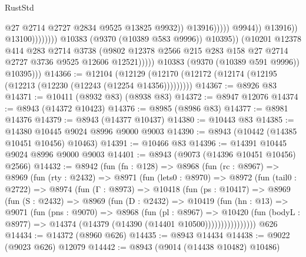 \begin{lexlean}{RustStd}
\begin{coremodule}
{\begin{coremodule}
{{{{{{{{{{{{{{{{{{{{{{{{{{{{{{{{{{{{{{{                                                          @27
                                                          @2714
                                                          @2727
                                                          @2834
                                                          @9525
                                                          @13825
                                                          @9932))
                                                      @13916)))))
                                            @9944))
                                        @13916))
                                    @13100))))))))
                    @10383
                    (@9370 (@10389 @583 @9996))
                    @10395))
                (@10201
                  @12378
                  @414
                  @283
                  @2714
                  @3738
                  (@9802 @12378 @2566 @215 @283 @158 @27 @2714 @2727 @3736 @9525 @12606 @12521)))))
          @10383
          (@9370 (@10389 @591 @9996))
          @10395)))
@14366 := @12104
    (@12129 (@12170 (@12172 (@12174 (@12195 (@12213 (@12230 (@12243 (@12254 @14356)))))))))
@14367 := @8926 @83
@14371 := @10411 (@8932 @83) (@8938 @83)
@14372 := @8947 @12076
@14374 := @8943 (@14372 @10423)
@14376 := @8985 (@8986 @83)
@14377 := @8981 @14376
@14379 := @8943 (@14377 @10437)
@14380 := @10443 @83
@14385 := @14380 @10445 @9024 @8996 @9000 @9003
@14390 := @8943 (@10442 (@14385 @10451 @10456) @10463)
@14391 := @10466 @83
@14396 := @14391 @10445 @9024 @8996 @9000 @9003
@14401 := @8943 (@9073 (@14396 @10451 @10456) @2566)
@14432 := @8942
    (fun (fn : @128) =>
    @8968
      (fun (rc : @8967) =>
      @8969
        (fun (rty : @2432) =>
        @8971
          (fun (lets0 : @8970) =>
          @8972
            (fun (tail0 : @2722) =>
            @8974
              (fun (Γ : @8973) =>
              @10418
                (fun (ps : @10417) =>
                @8969
                  (fun (S : @2432) =>
                  @8969
                    (fun (D : @2432) =>
                    @10419
                      (fun (hn : @13) =>
                      @9071
                        (fun (pns : @9070) =>
                        @8968
                          (fun (pl : @8967) =>
                          @10420
                            (fun (bodyL : @8977) =>
                            @14374 (@14379 (@14390 (@14401 @10500))))))))))))))))
    @626
@14434 := @14372 (@8960 @626)
@14435 := @8943 @14434
@14438 := @9022 (@9023 @626) @12079
@14442 := @8943 (@9014 (@14438 @10482) @10486)
}}}}}}}}}}}}}}}}}}}}}}}}}}}}}}}}}}}}}}}
\end{coremodule}}
\end{coremodule}
\end{lexlean}
